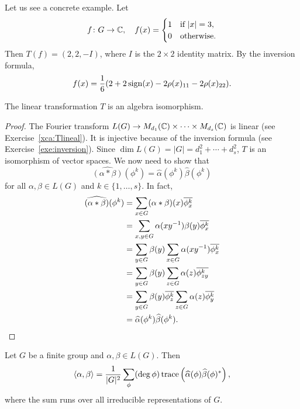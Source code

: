 \begin{example}
  Let us see a concrete example. Let
  \[
  f\colon G\to\mathbb{C},\quad 
    f(x)=\begin{cases}
    1 & \text{if $|x|=3$},\\
    0 & \text{otherwise.}
  \end{cases}
  \]
  Then $T(f)=(2,2,-I)$, where $I$ is the $2\times 2$ identity matrix. By the inversion formula, 
  \[
	f(x)=\frac16(2+2\operatorname{sign}(x)-2\rho(x)_{11}-2\rho(x)_{22}).
  \]
\end{example}

\begin{theorem}[Wedderburn]
  The linear transformation $T$ is an algebra isomorphism.  
\end{theorem}

\begin{proof}
  The Fourier transform $L(G)\to M_{d_1}(\mathbb{C})\times\cdots\times
  M_{d_s}(\mathbb{C})$ is linear (see Exercise~\ref{xca:Tlineal}). It is injective because of 
  the inversion formula (see Exercise~\ref{exe:inversion}). Since $\dim L(G)=|G|=d_1^2+\cdots+d_s^2$, $T$
  is an isomorphism of vector spaces. We now need to show that 
  \[
    \widehat{(\alpha*\beta)}(\phi^k)=\widehat{\alpha}(\phi^k)\widehat{\beta}(\phi^k)
  \]
  for all $\alpha,\beta\in L(G)$ and $k\in\{1,\dots,s\}$. In fact, 
  \begin{align*}
    \widehat{(\alpha*\beta)}(\phi^k) &= \sum_{x\in G}(\alpha*\beta)(x)\overline{\phi^k_x}\\
    &=\sum_{x,y\in G}\alpha(xy^{-1})\beta(y)\overline{\phi^k_x}\\
    &=\sum_{y\in G}\beta(y)\sum_{x\in G}\alpha(xy^{-1})\overline{\phi^k_x}\\
  &=\sum_{y\in G}\beta(y)\sum_{z\in G}\alpha(z)\overline{\phi^k_{zy}}\\
  &=\sum_{y\in G}\beta(y)\overline{\phi^k_z}\sum_{z\in G}\alpha(z)\overline{\phi^k_y}\\
  &=\widehat{\alpha}(\phi^k)\widehat{\beta}(\phi^k).\qedhere 
  \end{align*}
\end{proof}

\begin{theorem}[Plancherel]
  Let $G$ be a finite group and $\alpha,\beta\in L(G)$. Then 
  \[
	\langle \alpha,\beta\rangle
	=\frac{1}{|G|^2}\sum_{\phi}(\deg\phi)\operatorname{trace}\left(\widehat{\alpha}(\phi)\widehat{\beta}(\phi)^*\right),
  \]
  where the sum runs over all irreducible representations of $G$.
\end{theorem}

